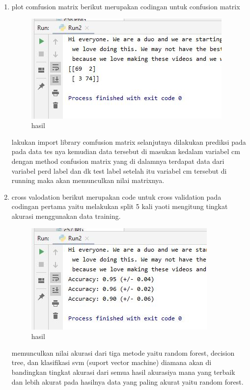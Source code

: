 \begin{enumerate}
\item plot comfusion matrix
berikut merupakan codingan untuk confusion matrix 

\begin{figure}[ht]
\centering
\includegraphics[scale=0.5]{figures/1174042/chapter4/2,6.JPG}
\caption{hasil}
\label{Praktek no 6}
\end{figure}
lakukan import library comfusion matrix selanjutnya dilakukan prediksi pada pada data tes nya kemudian data tersebut di masukan kedalam variabel cm dengan method confusion matrix yang di dalamnya terdapat data dari variabel perd label dan dk test label setelah itu variabel cm tersebut di running maka akan memunculkan nilai matrixnya. 

\item cross valodation 
berikut merupakan code untuk cross validation pada codingan pertama yaitu melakukan split 5 kali yaoti mengitung tingkat akurasi menggunakan data training.

\begin{figure}[ht]
\centering
\includegraphics[scale=0.5]{figures/1174042/chapter4/2,7.JPG}
\caption{hasil}
\label{Praktek no 7}
\end{figure}
memunculkan nilai akurasi dari tiga metode yaitu random forest, decision tree, dan klasifikasi svm (suport vector machine) diamana akan di bandingkan tingkat akurasi dari semua hasil akurasiya mana yang terbaik dan lebih akurat pada hasilnya data yang paling akurat yaitu random forest.


\end{enumerate}

